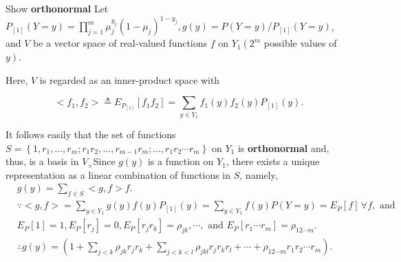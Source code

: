 \documentclass[UTF8,a4paper,10pt]{article}
\begin{document}
\begin{Problem}[]{Show  \textbf{orthonormal}}
Let $P_{[1]}(Y=y)=\prod_{j=1}^m \mu_j^{y_j}\left(1-\mu_j\right)^{1-y_j}, g(y)=P(Y=y) / P_{[1]}(Y=y)$, and $V$ be a vector space of real-valued functions $f$ on $Y_1\left(2^m\right.$ possible values of $\left.y\right)$. 

Here, $V$ is regarded as an inner-product space with

\[ <f_1, f_2>\triangleq E_{P_{[1]}}\left[f_1 f_2\right]=\sum_{y \in Y_1} f_1(y) f_2(y) P_{[1]}(y).\]

It follows easily that the set of functions $S=\left\{1, r_1, \ldots, r_m ; r_1 r_2, \ldots, r_{m-1} r_m ; \ldots, r_1 r_2 \cdots r_m\right\}$ on $Y_1$ is \textbf{orthonormal} and, thus, is a basis in $V_{\times}$Since $g(y)$ is a function on $Y_1$, there exists a unique representation as a linear combination of functions in $S$, namely,
$$
\begin{aligned}
& g(y)=\sum_{f \in S}<g, f>f . \\
& \because<g, f>=\sum_{y \in Y_1} g(y) f(y) P_{[1]}(y)=\sum_{y \in Y_1} f(y) P(Y=y)=E_P[f] \,\forall f, \text { and } \\
& E_P[1]=1, E_P\left[r_j\right]=0, E_P\left[r_j r_k\right]=\rho_{j k}, \cdots, \text { and } E_P\left[r_1 \cdots r_m\right]=\rho_{12 \cdots m} . \\
& \therefore g(y)=\left(1+\sum_{j<k} \rho_{j k} r_j r_k+\sum_{j<k<l} \rho_{j k l} r_j r_k r_l+\cdots+\rho_{12 \cdots m} r_1 r_2 \cdots r_m\right) .
\end{aligned}
$$
\end{Problem}

\begin{equation*}
  \begin{aligned}
  \end{aligned}
\end{equation*}
\end{document}
